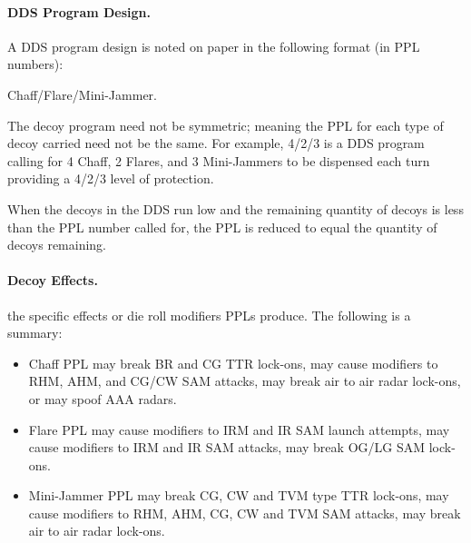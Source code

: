 \begin{advancedrules}
\paragraph{DDS Program Design.} A DDS program design is noted on paper in the following format (in PPL numbers): 
\begin{center}
    Chaff/Flare/Mini-Jammer. 
\end{center}
The decoy program need not be symmetric; meaning the PPL for each type of decoy carried need not be the same. For example, 4/2/3 is a DDS program calling for 4 Chaff, 2 Flares, and 3 Mini-Jammers to be dispensed each turn providing a 4/2/3 level of protection.

When the decoys in the DDS run low and the remaining quantity of decoys is less than the PPL number called for, the PPL is reduced to equal the quantity of decoys remaining.


\paragraph{Decoy Effects.}  the specific effects or die roll modifiers PPLs produce. The following is a summary:

\begin{itemize}

    \item Chaff PPL may break BR and CG TTR lock-ons, may cause modifiers to RHM, AHM, and CG/CW SAM attacks, may break air to air radar lock-ons, or may spoof AAA radars.

    \item Flare PPL may cause modifiers to IRM and IR SAM launch attempts, may cause modifiers to IRM and IR SAM attacks, may break OG/LG SAM lock-ons.

    \item Mini-Jammer PPL may break CG, CW and TVM type TTR lock-ons, may cause modifiers to RHM, AHM, CG, CW and TVM SAM attacks, may break air to air radar lock-ons.

\end{itemize}



\end{advancedrules}
